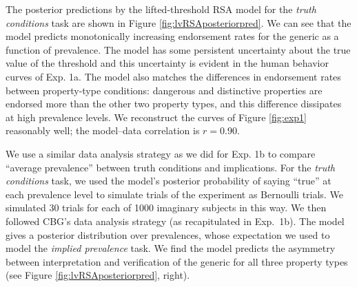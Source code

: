 \documentclass[10pt,letterpaper]{article}
\begin{document}
The posterior predictions by the lifted-threshold RSA model for the \emph{truth conditions} task are shown in Figure \ref{fig:lvRSAposteriorpred}. 
We can see that the model predicts monotonically increasing endorsement rates for the generic as a function of prevalence. The model has some persistent uncertainty about the true value of the threshold and this uncertainty is evident in the human behavior curves of Exp. 1a.
The model also matches the differences in endorsement rates between property-type conditions: dangerous and distinctive properties are endorsed more than the other two property types, and this difference dissipates at high prevalence levels.
We reconstruct the curves of Figure \ref{fig:exp1} reasonably well; the model--data correlation is $r = 0.90$.


We use a similar data analysis strategy as we did for Exp. 1b to compare ``average prevalence'' between truth conditions and implications. For the \emph{truth conditions} task, we used the model's posterior probability of saying ``true'' at each prevalence level to simulate trials of the experiment as Bernoulli trials. We simulated 30 trials for each of 1000 imaginary subjects in this way. We then followed CBG's data analysis strategy (as recapitulated in Exp.~1b). The model gives a posterior distribution over prevalences, whose expectation we used to model the \emph{implied prevalence} task. We find the model predicts the asymmetry between interpretation and verification of the generic for all three property types (see Figure \ref{fig:lvRSAposteriorpred}, right).

\end{document}
